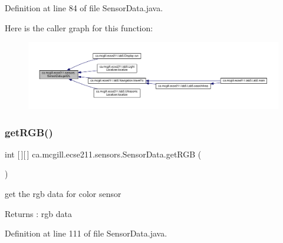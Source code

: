 Definition at line 84 of file Sensor\+Data.\+java.

Here is the caller graph for this function\+:
\nopagebreak
\begin{figure}[H]
\begin{center}
\leavevmode
\includegraphics[width=350pt]{classca_1_1mcgill_1_1ecse211_1_1sensors_1_1_sensor_data_a4e0eabd547726c90bd0b7252557d7ad7_icgraph}
\end{center}
\end{figure}
\mbox{\label{classca_1_1mcgill_1_1ecse211_1_1sensors_1_1_sensor_data_a0abd08431dae67c7ee0e7a18b5305f91}} 
\subsubsection{\texorpdfstring{get\+R\+G\+B()}{getRGB()}}
{\footnotesize\ttfamily int \mbox{[}$\,$\mbox{]}\mbox{[}$\,$\mbox{]} ca.\+mcgill.\+ecse211.\+sensors.\+Sensor\+Data.\+get\+R\+GB (\begin{DoxyParamCaption}{ }\end{DoxyParamCaption})}

get the rgb data for color sensor

\begin{DoxyReturn}{Returns}
\+: rgb data 
\end{DoxyReturn}


Definition at line 111 of file Sensor\+Data.\+java.

